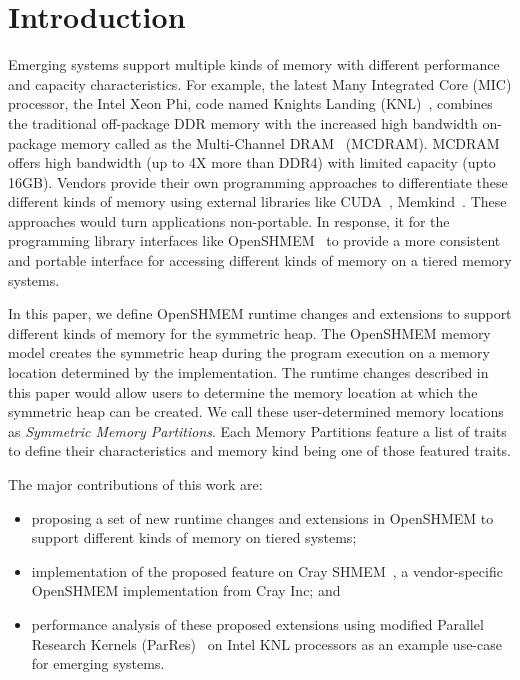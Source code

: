 \section{Introduction}
\label{src:intro}

Emerging systems support multiple kinds of memory with different
performance and capacity characteristics. For example, the latest
Many Integrated Core (MIC) processor, the Intel Xeon Phi,
code named Knights Landing (KNL)~\cite{KNL}, combines the traditional
off-package DDR memory with the increased high bandwidth on-package
memory called as the Multi-Channel DRAM~\cite{MCDRAM} (MCDRAM). MCDRAM
offers high bandwidth (up to 4X more than DDR4) with limited
capacity (upto 16GB). Vendors provide their own programming approaches
to differentiate these different kinds of memory using external libraries
like CUDA~\cite{cuda}, Memkind~\cite{memkind}. These approaches would
turn applications non-portable. In response, it for the programming
library interfaces like OpenSHMEM~\cite{osm} to provide a more consistent
and portable interface for accessing different kinds of memory on a
tiered memory systems.

In this paper, we define OpenSHMEM runtime changes and extensions to
support different kinds of memory for the symmetric heap. The OpenSHMEM
memory model creates the symmetric heap during the program execution on a
memory location determined by the implementation. The runtime changes
described in this paper would allow users to determine the memory
location at which the symmetric heap can be created. We call these
user-determined memory locations as \emph{Symmetric Memory Partitions}.
Each Memory Partitions feature a list of traits to define their
characteristics and memory kind being one of those featured traits.

The major contributions of this work are:
\begin{itemize}
    \item proposing a set of new runtime changes and extensions in
    OpenSHMEM to support different kinds of memory on tiered systems;
    \item implementation of the proposed feature on
    Cray SHMEM~\cite{csma}, a vendor-specific OpenSHMEM implementation
    from Cray Inc; and
    \item performance analysis of these proposed extensions using
    modified Parallel Research Kernels (ParRes)~\cite{parres} on Intel
    KNL processors as an example use-case for emerging systems.
\end{itemize}

